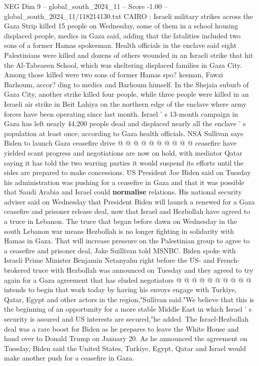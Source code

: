 \begin{textsample}{NEG Dim 9 – global\_south\_2024\_11 – Score -1.00 – global\_south\_2024\_11/118214130.txt}  \label{ex:f9_neg_313}
CAIRO : Israeli military strikes across the Gaza Strip killed 15 people on Wednesday, some of them in a school housing displaced people, medics in Gaza said, adding that the fatalities included two sons of a former Hamas spokesman.
Health officials in the enclave said eight Palestinians were killed and dozens of others wounded in an Israeli strike that hit the Al-Tabeaeen School, which was sheltering displaced families in Gaza City.
Among those killed were two sons of former Hamas spo? kesman, Fawzi Barhoum, accor? ding to medics and Barhoum himself.
In the Shejaia suburb of Gaza City, another strike killed four people, while three people were killed in an Israeli air strike in Beit Lahiya on the northern edge of the enclave where army forces have been operating since last month.
Israel ' s 13-month campaign in Gaza has left nearly 44,200 people dead and displaced nearly all the enclave ' s population at least once, according to Gaza health officials.
NSA Sullivan says Biden to launch Gaza ceasefire drive @ @ @ @ @ @ @ @ @ @ ceasefire have yielded scant progress and negotiations are now on hold, with mediator Qatar saying it has told the two warring parties it would suspend its efforts until the sides are prepared to make concessions.
US President Joe Biden said on Tuesday his administration was pushing for a ceasefire in Gaza and that it was possible that Saudi Arabia and Israel could \textbf{normalise} relations.
His national security adviser said on Wednesday that President Biden will launch a renewed for a Gaza ceasefire and prisoner release deal, now that Israel and Hezbollah have agreed to a truce in Lebanon.
The truce that began before dawn on Wednesday in the south Lebanon war means Hezbollah is no longer fighting in solidarity with Hamas in Gaza.
That will increase pressure on the Palestinian group to agree to a ceasefire and prisoner deal, Jake Suillivan told MSNBC.
Biden spoke with Israeli Prime Minister Benjamin Netanyahu right before the US- and French-brokered truce with Hezbollah was announced on Tuesday and they agreed to try again for a Gaza agreement that has eluded negotiators @ @ @ @ @ @ @ @ @ @ intends to begin that work today by having his envoys engage with Turkiye, Qatar, Egypt and other actors in the region,"Sullivan said."We believe that this is the beginning of an opportunity for a more stable Middle East in which Israel ' s security is assured and US interests are secured,"he added.
The Israel-Hezbollah deal was a rare boost for Biden as he prepares to leave the White House and hand over to Donald Trump on January 20.
As he announced the agreement on Tuesday, Biden said the United States, Turkiye, Egypt, Qatar and Israel would make another push for a ceasefire in Gaza.

\end{textsample}
